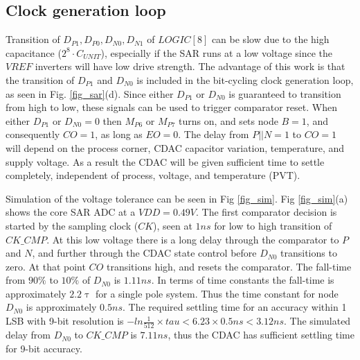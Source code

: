 \subsection{Clock generation loop}
Transition of $D_{P1}, D_{P0}, D_{N0}, D_{N1}$ of $LOGIC[8]$ can be slow due to the
high capacitance ($2^8 \cdot C_{UNIT}$), especially if the SAR runs at
a low voltage since the $VREF$ inverters will have low drive  strength. 
The advantage of this work is that the transition of $D_{P1}$ and $D_{N0}$
is included in the bit-cycling
clock generation loop, as seen in
Fig. \ref{fig_sar}(d). Since either $D_{P1}$ or $D_{N0}$ is guaranteed to transition
from high to low, these signals can be used to trigger comparator
reset. 
When either $D_{P1}$ or $D_{N0} = 0$ then $M_{P6}$ or $M_{P7}$ turns on, and sets
node $B=1$, and consequently $CO=1$, as long as $EO=0$. The delay from $P||N=1$ to
$CO=1$ will depend on the process corner, CDAC capacitor variation, temperature,  and supply voltage. As a result the CDAC will be given sufficient
time to settle completely, independent of process, voltage, and
temperature (PVT). 

Simulation of the voltage tolerance can be seen in Fig
\ref{fig_sim}. Fig \ref{fig_sim}(a) shows the core SAR ADC at a
$VDD=0.49V$. 
The first comparator decision is started by the sampling clock ($CK$),
seen at $1ns$ for low to high transition of $CK\_CMP$. At this low voltage
there is a long delay through the comparator to $P$ and $N$, and
further through the CDAC state control before $D_{N0}$ transitions to
zero. At that point $CO$ transitions high, and resets the
comparator. The fall-time from $90\%$ to $10\%$ of $D_{N0}$ is
$1.11ns$. In terms of time constants the fall-time is approximately
$ 2.2 \uptau$ for a single pole system. Thus the time constant for
node $D_{N0}$ is approximately $0.5ns$. The required settling
time for an accuracy within 1 LSB with 9-bit resolution is $-ln\frac{1}{512} \times tau <
6.23 \times 0.5ns < 3.12ns $. The simulated delay from $D_{N0}$ to $CK\_CMP$ is $7.11ns$, thus the CDAC has
sufficient settling time for 9-bit accuracy.

